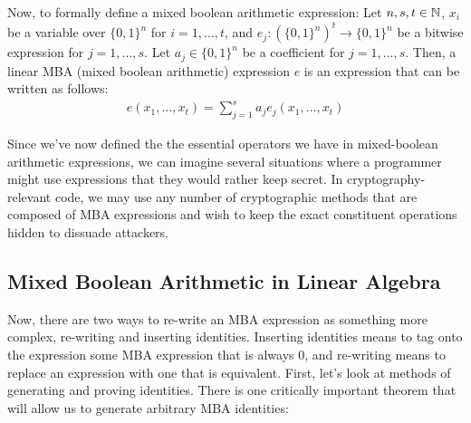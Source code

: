 \par Now, to formally define a mixed boolean arithmetic expression:
 {Let $n,s,t \in \mathbb{N}$, $x_i$ be a variable over $\{0,1\}^n$ for
$i = 1,...,t$, and $e_j : (\{0,1\}^n)^t \rightarrow \{0,1\}^n$ be a bitwise expression for
$j = 1,...,s$. Let $a_j\in \{0,1\}^n$ be a coefficient for $j = 1,...,s$.
Then, a linear MBA (mixed boolean arithmetic) expression $e$ is an expression that can be written as follows:
\begin{align*}
    e(x_1, ..., x_t) = \sum_{j=1}^s a_j e_j(x_1,...,x_t)
\end{align*}
}
\par Since we've now defined the the essential operators we have in mixed-boolean 
arithmetic
expressions, we can imagine several situations where a programmer might use expressions 
that they would rather keep secret. In cryptography-relevant code, we may use any
number of cryptographic methods that are composed of MBA 
expressions
and wish to keep the exact constituent operations hidden 
to dissuade attackers. 
\\
\subsection{Mixed Boolean Arithmetic in Linear Algebra}
Now, there are two ways to re-write an MBA expression as something more complex, 
re-writing and inserting identities. Inserting identities means to tag onto
the expression some MBA expression that is always 0, and re-writing means to 
replace an expression with one that is equivalent. First, let's look at methods
of generating and proving identities. There is one critically important theorem 
that will allow us to generate arbitrary MBA identities:

